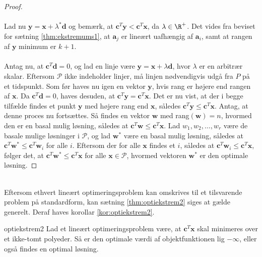 \begin{proof}
\\\\
Lad nu $\textbf{y} = \textbf{x} + \lambda^* \textbf{d} $ og bemærk, at $ \textbf{c}^T \textbf{y} < \textbf{c}^T \textbf{x}$, da $ \lambda \in \R^+ $. 
Det vides fra beviset for sætning \ref{thm:ekstremums1}, at $\textbf{a}_j$ er lineært uafhængig af $\textbf{a}_i$, samt at rangen af $\textbf{y}$ minimum er $k + 1$. 
\\\\
%
Antag nu, at $\textbf{c}^T \textbf{d} = 0$, og lad en linje være $\textbf{y} = \textbf{x} + \lambda \textbf{d}$, hvor $ \lambda $ er en arbitrær skalar. 
Eftersom $\mathcal{P}$ ikke indeholder linjer, må linjen nødvendigvis udgå fra $P$ på et tidspunkt. 
Som før haves nu igen en vektor $\textbf{y}$, hvis rang er højere end rangen af $\textbf{x}$. 
Da $\textbf{c}^T \textbf{d} = 0$, haves desuden, at $\textbf{c}^T \textbf{y} = \textbf{c}^T \textbf{x}$. 
Det er nu vist, at der i begge tilfælde findes et punkt $\textbf{y}$ med højere rang end $\textbf{x}$, således $\textbf{c}^T \textbf{y} \leq \textbf{c}^T \textbf{x}$. 
Antag, at denne proces nu fortsættes.
Så findes en vektor $\textbf{w}$ med rang$(\textbf{w})=n$, hvormed den er en basal mulig løsning, således at $\textbf{c}^T \textbf{w} \leq \textbf{c}^T \textbf{x}$. 
Lad $w_1, w_2, \ldots , w_r$ være de basale mulige løsninger i $\mathcal{P}$, og lad $\textbf{w}^*$ være en basal mulig løsning, således at $\textbf{c}^T \textbf{w}^* \leq \textbf{c}^T \textbf{w}_i$ for alle $i$. 
Eftersom der for alle $\textbf{x}$ findes et $i$, således at $\textbf{c}^T \textbf{w}_i \leq \textbf{c}^T \textbf{x}$, følger det, at $\textbf{c}^T \textbf{w}^* \leq \textbf{c}^T \textbf{x}$ for alle $\textbf{x} \in \mathcal{P}$, hvormed vektoren $\textbf{w}^*$ er den optimale løsning. 
\end{proof}\\
%
Eftersom ethvert lineært optimeringsproblem kan omskrives til et tilsvarende problem på standardform, kan sætning \ref{thm:optiekstrem2} siges at gælde generelt. 
Deraf haves korollar \ref{kor:optiekstrem2}. 
%
\begin{kor}{}{optiekstrem2}
Lad et lineært optimeringsproblem være, at $\textbf{c}^T \textbf{x}$ skal minimeres over et ikke-tomt polyeder.
Så er den optimale værdi af objektfunktionen lig $- \infty$, eller også findes en optimal løsning. 
\end{kor}
%
%